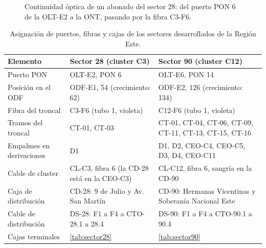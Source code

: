 \begin{figure}[H]
    \caption{Continuidad óptica de un abonado del sector 28: del puerto PON 6 de la OLT-E2 a la ONT, pasando por la fibra C3-F6.}
    \label{fig:continuidad}
\end{figure}

\begin{table}[H]
    \centering
    \footnotesize
    \caption{Asignación de puertos, fibras y cajas de los sectores desarrollados de la Región Este.}
    \label{tab:continuidad}
    \begin{tabular}{|l|p{5.6cm}|p{5.6cm}|}
        \hline
        \textbf{Elemento} & \textbf{Sector 28 (cluster C3)} & \textbf{Sector 90 (cluster C12)} \\
        \hline
        Puerto PON & OLT-E2, PON 6 & OLT-E6, PON 14 \\
        Posición en el ODF & ODF-E1, 54 (crecimiento: 62) & ODF-E2, 126 (crecimiento: 134) \\
        Fibra del troncal & C3-F6 (tubo 1, violeta) & C12-F6 (tubo 1, violeta) \\
        Tramos del troncal & CT-01, CT-03 & CT-01, CT-04, CT-06, CT-09, CT-11, CT-13, CT-15, CT-16 \\
        Empalmes en derivaciones & D1 & D1, D2, CEO-C4, CEO-C5, D3, D4, CEO-C11 \\
        Cable de cluster & CL-C3, fibra 6 (la CD-28 está en la CEO-C3) & CL-C12, fibra 6, sangría en la CD-90 \\
        Caja de distribución & CD-28: 9 de Julio y Av. San Martín & CD-90: Hermanas Vicentinas y Soberanía Nacional Este \\
        Cable de distribución & DS-28: F1 a F4 a CTO-28.1 a 28.4 & DS-90: F1 a F4 a CTO-90.1 a 90.4 \\
        Cajas terminales & \autoref{tab:sector28} & \autoref{tab:sector90} \\
        \hline
    \end{tabular}
\end{table}

